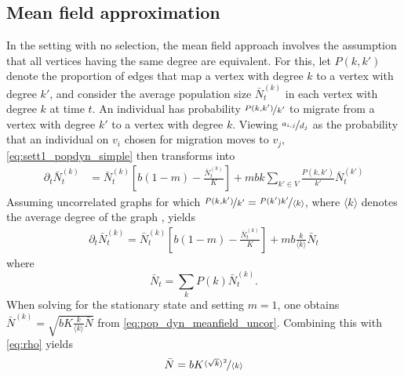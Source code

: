   \subsection{Mean field approximation}
  In the setting with no selection, the mean field approach involves the assumption that all vertices having the same degree are equivalent. For this, let $P(k,k')$ denote the proportion of edges that map a vertex with degree $k$ to a vertex with degree $k'$, and consider the average population size $\bar{N}_t^{(k)}$ in each vertex with degree $k$ at time $t$. An individual has probability $\nicefrac{P(k,k')}{k'}$ to migrate from a vertex with degree $k'$ to a vertex with degree $k$. 
  Viewing $\nicefrac{a_{i,j}}{d_j}$ as the probability that an individual on $v_i$ chosen for migration moves to $v_j$,
  \cref{eq:sett1_popdyn_simple} then transforms into 
  \begin{equation}
	\begin{split}\label{eq:popsize_rho}
	  \partial_t \bar{N}_t^{(k)} &= \bar{N}_t^{(k)} \left[ b(1-m)- \frac{\bar{N}_t^{(k)}}{K} \right] + m b k \sum_{k'\in V} \frac{P(k,k')}{k'} \bar{N}_t^{(k')} 
	\end{split}
  \end{equation}
  Assuming uncorrelated graphs for which $ \nicefrac{P(k,k')}{k'} = \nicefrac{P(k')k'}{\langle k\rangle}$, where ${\langle k \rangle}$ denotes the average degree of the graph \cite{Colizza2007}, yields 
  \begin{equation}\label{eq:pop_dyn_meanfield_uncor}
	\begin{split}
	  \partial_t \bar{N}_t^{(k)} = \bar{N}_t^{(k)} \left[ b(1-m) - \frac{\bar{N}_t^{(k)}}{K} \right] + m b \frac{k}{\langle k \rangle}  \bar{N}_t
	\end{split}
  \end{equation}
  where 
  \begin{equation}\label{eq:rho}
  \bar{N}_t = \sum_k P(k) \bar{N}_t^{(k)}. 
  \end{equation}
  When solving for the stationary state and setting $m=1$, one obtains $\bar{N}^{(k)} = \sqrt{b K \frac{ k }{\langle k \rangle} \bar{N}}$ from \cref{eq:pop_dyn_meanfield_uncor}. Combining this with \cref{eq:rho} yields 
  \begin{equation}\label{eq:mean_field_set1}
	  \bar{N} = b K \nicefrac{\langle \sqrt{ k } \rangle^2}{\langle k \rangle}
  \end{equation}
  
